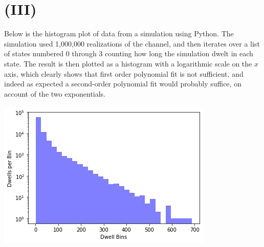 \documentclass{article}
\begin{document}
\section*{\textbf{(III)}}
Below is the histogram plot of data from a simulation using Python. The simulation used 1,000,000 realizations of the channel, and then iterates over a list of states numbered 0 through 3 counting how long the simulation dwelt in each state. The result is then plotted as a histogram with a logarithmic scale on the $x$ axis, which clearly shows that first order polynomial fit is not sufficient, and indeed as expected a second-order polynomial fit would probably suffice, on account of the two exponentials. 

\begin{center}
    \includegraphics[scale = .75]{hw2_part3_2.png}
\end{center}
\end{document}

